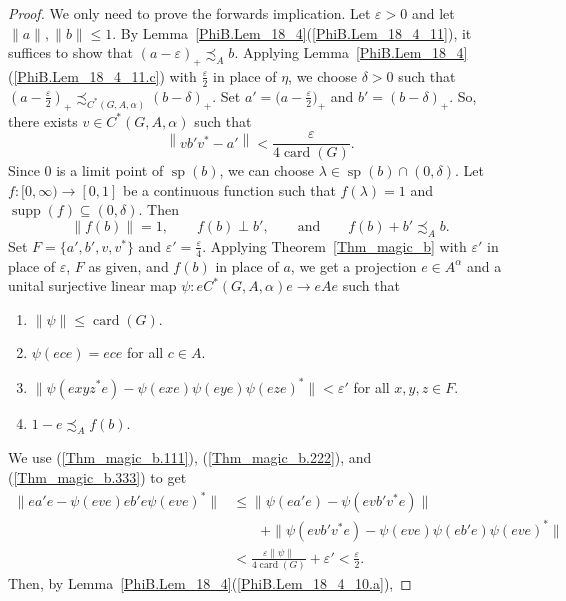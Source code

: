 \documentclass[10pt]{amsart}
\numberwithin{equation}{section}
\theoremstyle{definition}
\newcommand{\af}{\alpha}
\newcommand{\dt}{\delta}
\newcommand{\ep}{\varepsilon}
\newcommand{\ld}{\lambda}
\newcommand{\spec}{{\operatorname{sp}}}
\newcommand{\supp}{{\operatorname{supp}}}
\newcommand{\card}{{\operatorname{card}}}
\newcommand{\andeqn}{\qquad {\mbox{and}} \qquad}
\newcommand{\CGAa}{C^* (G, A, \af)}
\newcommand{\cfn}{continuous function}
\newcommand{\I}{\infty}
\newcommand{\Thm}[1]{Theorem~\ref{#1}}
\begin{document}
\begin{proof}
We only need to prove the forwards implication. Let $\ep > 0$ and let  $\| a \|, \| b \| \leq 1$.
By Lemma~\ref{PhiB.Lem_18_4}(\ref{PhiB.Lem_18_4_11}), it suffices to show that
 $(a - \ep)_+ \precsim_{A} b$.
Applying Lemma~\ref{PhiB.Lem_18_4}(\ref{PhiB.Lem_18_4_11.c}) with $\frac{\ep}{2}$ in place of $\eta$, 
we choose $\dt > 0$ such that
$\left(a - \tfrac{\ep}{2} \right)_+  \precsim_{C^*(G, A, \alpha)} (b- \delta)_+$.
Set $a' = \big(a - \tfrac{\ep}{2}\big)_+$ and $b' = (b - \dt)_+$.
So, there exists $v \in C^*(G, A, \alpha)$ such that 
\begin{equation}
\left\| v  b'  v^* - a' \right\| < \frac{\ep}{4 \card (G)}.
\end{equation} 
Since $0$ is a limit point of $\spec(b)$, we can choose $\ld \in \spec (b) \cap (0, \dt)$.
Let $f \colon [0, \I) \to [0, 1]$
be a \cfn{}
such that $f (\ld) = 1$ and $\supp (f) \subseteq (0, \dt)$.
Then
%
\begin{equation}\label{Eq1.190711}
\| f (b) \| = 1,
\qquad
f (b) \perp b',
\andeqn
f (b) + b' \precsim_{A} b.
\end{equation}
Set 
$
F= \{ a', b',  v, v^* \}$
and 
$\ep'= \frac{\ep}{4}$.
Applying \Thm{Thm_magic_b} with $\ep'$ in place of $\ep$, $F$ as given, and  $f(b)$ in place of $a$,
we get a projection $e \in A^{\alpha}$ and  a unital surjective linear map 
$\psi \colon e \CGAa e \to e A e$ such that
\begin{enumerate}
\item \label{Thm_magic_b.111}
$\| \psi \| \leq \card (G)$.
\item \label{Thm_magic_b.222}
$\psi (e c e) = e c e$ for all $c \in A$.
\item \label{Thm_magic_b.333}
$\| \psi (e xy z^* e) - \psi (e x e) \psi (e y e) \psi (e z e)^*\| < \ep'$ 
for all $x, y, z \in F$.
\item \label{Thm_magic_b.444}
$1-e \precsim_A f(b)$.
\end{enumerate}
We use (\ref{Thm_magic_b.111}), (\ref{Thm_magic_b.222}), and (\ref{Thm_magic_b.333}) to get
\begin{align*}
\| e a' e  - \psi (e v e) e b' e \psi (e v e)^* \|
&\leq
\| \psi (e a' e ) - \psi ( e v b' v^* e) \|
\\
&\qquad +
\| \psi ( e v b' v^* e) - \psi (e v e ) \psi (e b' e)  \psi (e  v e)^* \|
\\
&<
 \frac{\ep \| \psi \|}{4 \card (G)}
+
\ep' < \frac{\ep}{2}.
\end{align*}
Then, by Lemma~\ref{PhiB.Lem_18_4}(\ref{PhiB.Lem_18_4_10.a}), 

\end{proof}
\end{document}
